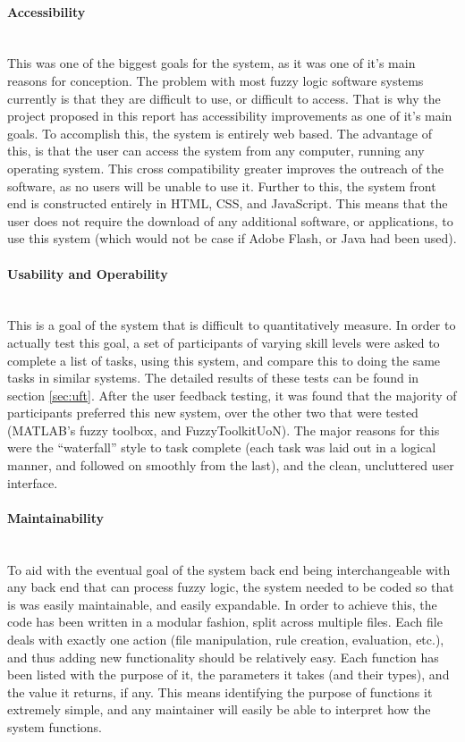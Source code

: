 \paragraph{Accessibility}\ \\
This was one of the biggest goals for the system, as it was one of it's main reasons for conception. The problem with most fuzzy logic software systems currently is that they are difficult to use, or difficult to access. That is why the project proposed in this report has accessibility improvements as one of it's main goals. To accomplish this, the system is entirely web based. The advantage of this, is that the user can access the system from any computer, running any operating system. This cross compatibility greater improves the outreach of the software, as no users will be unable to use it. Further to this, the system front end is constructed entirely in HTML, CSS, and JavaScript. This means that the user does not require the download of any additional software, or applications, to use this system (which would not be case if Adobe Flash, or Java had been used). 

\paragraph{Usability and Operability}\ \\
This is a goal of the system that is difficult to quantitatively measure. In order to actually test this goal, a set of participants of varying skill levels were asked to complete a list of tasks, using this system, and compare this to doing the same tasks in similar systems. The detailed results of these tests can be found in section \ref{sec:uft}. After the user feedback testing, it was found that the majority of participants preferred this new system, over the other two that were tested (MATLAB's fuzzy toolbox, and FuzzyToolkitUoN). The major reasons for this were the ``waterfall'' style to task complete (each task was laid out in a logical manner, and followed on smoothly from the last), and the clean, uncluttered user interface. 

\paragraph{Maintainability}\ \\
To aid with the eventual goal of the system back end being interchangeable with any back end that can process fuzzy logic, the system needed to be coded so that is was easily maintainable, and easily expandable. In order to achieve this, the code has been written in a modular fashion, split across multiple files. Each file deals with exactly one action (file manipulation, rule creation, evaluation, etc.), and thus adding new functionality should be relatively easy. Each function has been listed with the purpose of it, the parameters it takes (and their types), and the value it returns, if any. This means identifying the purpose of functions it extremely simple, and any maintainer will easily be able to interpret how the system functions. 

